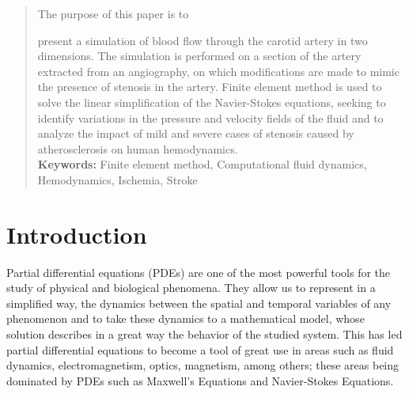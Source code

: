 \documentclass[12pt,letterpaper]{article}
\begin{document}
\begin{abstract}
    
  The purpose of this paper is to 
  
  present a simulation of blood flow through the carotid artery in two dimensions. The simulation is performed on a section of the artery extracted from an angiography, on which modifications are made to mimic the presence of stenosis in the artery. Finite element method is used to solve the linear simplification of the Navier-Stokes equations, seeking to identify variations in the pressure and velocity fields of the fluid and to analyze the impact of mild and severe cases of stenosis caused by atherosclerosis on human hemodynamics.\\
  
    \noindent \textbf{Keywords:} Finite element method, Computational fluid dynamics, Hemodynamics, Ischemia, Stroke 
    \end{abstract}

\section{Introduction}

Partial differential equations (PDEs) are one of the most powerful tools for the study of physical and biological phenomena. They allow us to represent in a simplified way, the dynamics between the spatial and temporal variables of any phenomenon and to take these dynamics to a mathematical model, whose solution describes in a great way the behavior of the studied system\cite{logan2014applied}. This has led partial differential equations to become a tool of great use in areas such as fluid dynamics, electromagnetism, optics, magnetism, among others\cite{farlow1993partial}; these areas being dominated by PDEs such as Maxwell's Equations and Navier-Stokes Equations. \\
\end{document}
